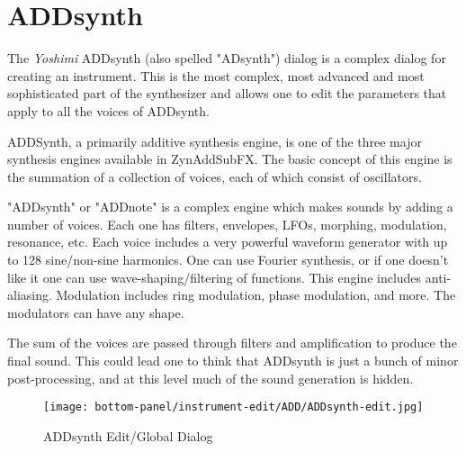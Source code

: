 %
%
%

\section{ADDsynth}
\label{sec:addsynth}

   The \textsl{Yoshimi} ADDsynth (also spelled "ADsynth")
   dialog is a complex dialog for creating an
   instrument.  This is the most complex, most advanced and most
   sophisticated part of the synthesizer and allows one to edit the
   parameters that apply to all the voices of ADDsynth.

   ADDSynth, a primarily additive synthesis engine, is one of the three major
   synthesis engines available in ZynAddSubFX. The basic concept of this
   engine is the summation of a collection of voices, each of which consist
   of oscillators.

   "ADDsynth" or "ADDnote" is a complex engine which makes sounds by adding a
   number of voices. Each one has filters, envelopes, LFOs, morphing,
   modulation, resonance, etc.
   Each voice includes a very powerful
   waveform generator with up to 128 sine/non-sine harmonics. One can use
   Fourier synthesis, or if one doesn't like it one can use
   wave-shaping/filtering of functions. This engine includes anti-aliasing.
   Modulation includes ring modulation, phase modulation, and more.
   The modulators can have any shape.
   \cite{zyndoc}

   The sum of the voices are passed through filters and amplification to
   produce the final sound. This could lead one to think that ADDsynth is just
   a bunch of minor post-processing, and at this level much of the sound
   generation is hidden.

\begin{figure}[H]
   \centering 
   \texttt{[image: bottom-panel/instrument-edit/ADD/ADDsynth-edit.jpg]}
   \caption{ADDsynth Edit/Global Dialog}
   \label{fig:addsynth_edit_dialog}
\end{figure}


